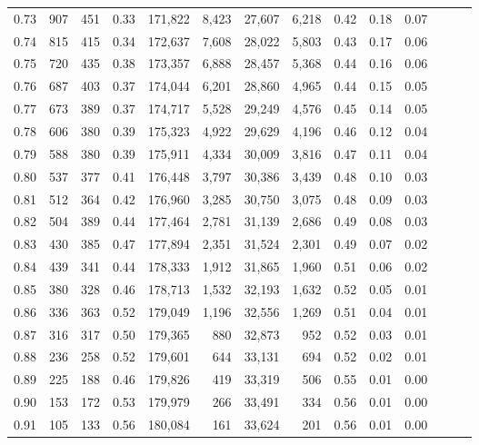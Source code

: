 \begin{tabular}{rrrrrrrrrrrrrr}
0.73 &    907 &  451 &  0.33 &  171,822 &    8,423 &  27,607 &   6,218 &  0.42 &  0.18 &      0.07 \\
0.74 &    815 &  415 &  0.34 &  172,637 &    7,608 &  28,022 &   5,803 &  0.43 &  0.17 &      0.06 \\
0.75 &    720 &  435 &  0.38 &  173,357 &    6,888 &  28,457 &   5,368 &  0.44 &  0.16 &      0.06 \\
0.76 &    687 &  403 &  0.37 &  174,044 &    6,201 &  28,860 &   4,965 &  0.44 &  0.15 &      0.05 \\
0.77 &    673 &  389 &  0.37 &  174,717 &    5,528 &  29,249 &   4,576 &  0.45 &  0.14 &      0.05 \\
0.78 &    606 &  380 &  0.39 &  175,323 &    4,922 &  29,629 &   4,196 &  0.46 &  0.12 &      0.04 \\
0.79 &    588 &  380 &  0.39 &  175,911 &    4,334 &  30,009 &   3,816 &  0.47 &  0.11 &      0.04 \\
0.80 &    537 &  377 &  0.41 &  176,448 &    3,797 &  30,386 &   3,439 &  0.48 &  0.10 &      0.03 \\
0.81 &    512 &  364 &  0.42 &  176,960 &    3,285 &  30,750 &   3,075 &  0.48 &  0.09 &      0.03 \\
0.82 &    504 &  389 &  0.44 &  177,464 &    2,781 &  31,139 &   2,686 &  0.49 &  0.08 &      0.03 \\
0.83 &    430 &  385 &  0.47 &  177,894 &    2,351 &  31,524 &   2,301 &  0.49 &  0.07 &      0.02 \\
0.84 &    439 &  341 &  0.44 &  178,333 &    1,912 &  31,865 &   1,960 &  0.51 &  0.06 &      0.02 \\
0.85 &    380 &  328 &  0.46 &  178,713 &    1,532 &  32,193 &   1,632 &  0.52 &  0.05 &      0.01 \\
0.86 &    336 &  363 &  0.52 &  179,049 &    1,196 &  32,556 &   1,269 &  0.51 &  0.04 &      0.01 \\
0.87 &    316 &  317 &  0.50 &  179,365 &      880 &  32,873 &     952 &  0.52 &  0.03 &      0.01 \\
0.88 &    236 &  258 &  0.52 &  179,601 &      644 &  33,131 &     694 &  0.52 &  0.02 &      0.01 \\
0.89 &    225 &  188 &  0.46 &  179,826 &      419 &  33,319 &     506 &  0.55 &  0.01 &      0.00 \\
0.90 &    153 &  172 &  0.53 &  179,979 &      266 &  33,491 &     334 &  0.56 &  0.01 &      0.00 \\
0.91 &    105 &  133 &  0.56 &  180,084 &      161 &  33,624 &     201 &  0.56 &  0.01 &      0.00 \\

\end{tabular}
